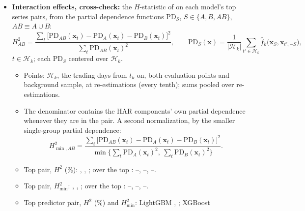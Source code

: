 \begin{itemize}
\begin{itemize}
    \rhfiXgbWithinTop{} (\rhfiXgbWithinTopVal), \rhfiRfWithinTop{} (\rhfiRfWithinTopVal); $\times 10^{-3}$.
  \item Noise floor: the continuous probe's largest $\bar I$ with any group, median over probe fits:
    \rhfiLgbmInterFloor, \rhfiXgbInterFloor, \rhfiRfInterFloor{} ($\times 10^{-3}$); series pairs above it:
    \rhfiLgbmInterAboveFloor, \rhfiXgbInterAboveFloor, \rhfiRfInterAboveFloor{} of \rhfiNPairs.
  \end{itemize}
\item \textbf{Interaction effects, cross-check:} the $H$-statistic of \citet{FriedmanPopescu2008} on each model's top
  \rhfiHTopSeries{} series pairs, from the partial dependence functions $\mathrm{PD}_S$, $S \in \{A, B, AB\}$,
  $AB \equiv A \cup B$:
  \[
    H^2_{AB} = \frac{\sum_{t} \bigl[\mathrm{PD}_{AB}(\bm x_t) - \mathrm{PD}_A(\bm x_t) - \mathrm{PD}_B(\bm x_t)\bigr]^2}
                    {\sum_{t} \mathrm{PD}_{AB}(\bm x_t)^2}, \qquad
    \mathrm{PD}_S(\bm x) = \frac{1}{|\mathcal H_k|} \sum_{t' \in \mathcal H_k} \hat f_k\bigl(\bm x_S, \bm x_{t',-S}\bigr),
  \]
  $t \in \mathcal H_k$; each $\mathrm{PD}_S$ centered over $\mathcal H_k$.
  \begin{itemize}
  \item Points: $\mathcal H_k$, the \rhfiHRows{} trading days from $t_k$ on, both evaluation points and background
    sample, at \rhfiHRefits{} re-estimations (every tenth); sums pooled over re-estimations.
  \item The denominator contains the HAR components' own partial dependence whenever they are in the pair. A second
    normalization, by the smaller single-group partial dependence:
    \[
      H^2_{\min,AB} = \frac{\sum_{t} \bigl[\mathrm{PD}_{AB}(\bm x_t) - \mathrm{PD}_A(\bm x_t) - \mathrm{PD}_B(\bm x_t)\bigr]^2}
                           {\min\bigl\{\sum_{t} \mathrm{PD}_A(\bm x_t)^2,\ \sum_{t} \mathrm{PD}_B(\bm x_t)^2\bigr\}} .
    \]
  \item Top pair, $H^2$ (\%): \rhfiLgbmHTop, \rhfiXgbHTop, \rhfiRfHTop; over the top \rhfiHTopSeries:
    \rhfiLgbmHMin--\rhfiLgbmHMax, \rhfiXgbHMin--\rhfiXgbHMax, \rhfiRfHMin--\rhfiRfHMax.
  \item Top pair, $H^2_{\min}$: \rhfiLgbmHMinTop, \rhfiXgbHMinTop, \rhfiRfHMinTop; over the top
    \rhfiHTopSeries: \rhfiLgbmHMinLo--\rhfiLgbmHMinHi, \rhfiXgbHMinLo--\rhfiXgbHMinHi, \rhfiRfHMinLo--\rhfiRfHMinHi.
  \item Top predictor pair, $H^2$ (\%) and $H^2_{\min}$: LightGBM \rhfiLgbmHColTop, \rhfiLgbmHMinColTop; XGBoost

\end{itemize}
\end{itemize}
